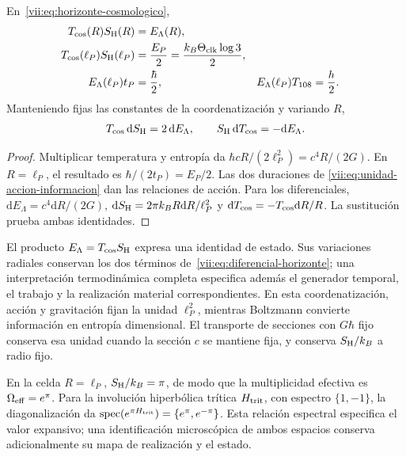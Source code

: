 \begin{theorem}
\label{vii:thm:celda-media-accion}
En~\eqref{vii:eq:horizonte-cosmologico},
\begin{align}
 T_{\rm cos}(R)S_{\rm H}(R)&=E_\Lambda(R),\\
 T_{\rm cos}(\ell_P)S_{\rm H}(\ell_P)
 &=\frac{E_P}{2}=\frac{k_B\Theta_{\rm clk}\log3}{2},\\
 E_\Lambda(\ell_P)t_P&=\frac{\hbar}{2},&
 E_\Lambda(\ell_P)T_{108}&=\frac h2.
 \label{vii:eq:media-accion-horizonte}
\end{align}
Manteniendo fijas las constantes de la coordenatización y variando \(R\),
\begin{equation}
 T_{\rm cos}\,\mathrm dS_{\rm H}=2\,\mathrm dE_\Lambda,
 \qquad S_{\rm H}\,\mathrm dT_{\rm cos}=-\mathrm dE_\Lambda.
 \label{vii:eq:diferencial-horizonte}
\end{equation}
\end{theorem}
\begin{proof}
Multiplicar temperatura y entropía da
\(\hbar cR/(2\ell_P^2)=c^4R/(2G)\).
En \(R=\ell_P\), el resultado es
\(\hbar/(2t_P)=E_P/2\). Las dos duraciones de
\eqref{vii:eq:unidad-accion-informacion} dan las relaciones de acción.
Para los diferenciales,
\(\mathrm dE_\Lambda=c^4\mathrm dR/(2G)\),
\(\mathrm dS_{\rm H}=2\pi k_BR\mathrm dR/\ell_P^2\) y
\(\mathrm dT_{\rm cos}=-T_{\rm cos}\mathrm dR/R\).
La sustitución prueba ambas identidades.
\end{proof}

El producto \(E_\Lambda=T_{\rm cos}S_{\rm H}\) expresa una
identidad de estado. Sus variaciones radiales conservan los dos términos
de~\eqref{vii:eq:diferencial-horizonte}; una interpretación termodinámica
completa especifica además el generador temporal, el trabajo y la
realización material correspondientes. En esta coordenatización, acción y
gravitación fijan la unidad \(\ell_P^2\), mientras Boltzmann convierte
información en entropía dimensional. El transporte de secciones con
\(G\hbar\) fijo conserva esa unidad cuando la sección \(c\) se
mantiene fija, y conserva \(S_{\rm H}/k_B\) a radio fijo.

En la celda \(R=\ell_P\), \(S_{\rm H}/k_B=\pi\), de modo que
la multiplicidad efectiva es \(\Omega_{\rm eff}=e^\pi\).
Para la involución hiperbólica trítica \(H_{\rm trit}\), con espectro
\(\{1,-1\}\), la diagonalización da
\(\operatorname{spec}(e^{\pi H_{\rm trit}})=\{e^\pi,e^{-\pi}\}\).
Esta relación espectral especifica el valor expansivo; una identificación
microscópica de ambos espacios conserva adicionalmente su mapa de
realización y el estado.

